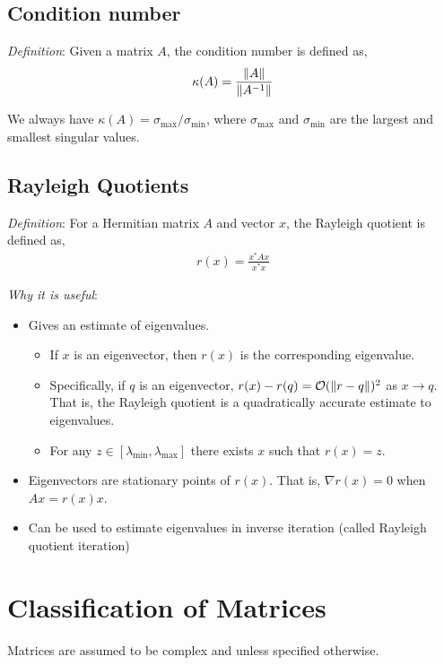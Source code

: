 \documentclass[12pt]{article}
\begin{document}
\subsection{Condition number}
\textit{Definition}: Given a matrix \( A \), the condition number is defined as,
\begin{align*}
    \kappa(A) = \frac{\left\lVert A\right\rVert}{\left\lVert A^{-1}\right\rVert}
\end{align*}

We always have \( \kappa(A) = \sigma_{\text{max}}/\sigma_{\text{min}} \), where \( \sigma_\text{max} \) and \( \sigma_\text{min} \) are the largest and smallest singular values.


\subsection{Rayleigh Quotients}
\textit{Definition}: For a Hermitian matrix \( A \) and vector \( x \), the Rayleigh quotient is defined as,
\begin{align*}
    r(x) = \frac{x^*Ax}{x^*x}
\end{align*}

\textit{Why it is useful}:
\begin{itemize}[nolistsep]
    \item Gives an estimate of eigenvalues.
        \begin{itemize}[nolistsep]
            \item If \( x \) is an eigenvector, then \( r(x) \) is the corresponding eigenvalue.
            \item Specifically, if \( q \) is an eigenvector, \( r(x) - r(q) = \mathcal{O}(\left\lVert r-q\right\rVert)^2 \) as \( x\to q \). That is, the Rayleigh quotient is a quadratically accurate estimate to eigenvalues.
            \item For any \( z\in[\lambda_{\text{min}},\lambda_{\text{max}}] \) there exists \( x \) such that \( r(x) = z \).
        \end{itemize}
    \item Eigenvectors are stationary points of \( r(x) \). That is, \( \nabla r(x) = 0 \) when \( Ax = r(x) x \).
    \item Can be used to estimate eigenvalues in inverse iteration (called Rayleigh quotient iteration)
\end{itemize}





\pagebreak
\section{Classification of Matrices}
Matrices are assumed to be complex and unless specified otherwise.
\end{document}
